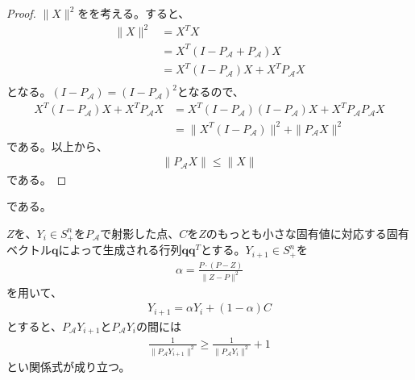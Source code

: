 \begin{proof}
  $\|X\|^2$をを考える。すると、
  \begin{align*}
    \|X\|^2 & = X^T X \\
            & = X^T \left(I - P_\mathcal{A} + P_\mathcal{A}\right) X \\
            & = X^T \left(I - P_\mathcal{A}\right) X + X^T P_\mathcal{A} X \\
  \end{align*}
  となる。$\left(I - P_\mathcal{A}\right) = \left(I - P_\mathcal{A}\right)^2$となるので、
  \begin{align*}
    X^T \left(I - P_\mathcal{A}\right) X + X^T P_\mathcal{A} X & = X^T \left(I - P_\mathcal{A}\right) \left(I - P_\mathcal{A}\right) X + X^T P_\mathcal{A} P_\mathcal{A} X\\
                                                               & = \|X^T \left(I - P_\mathcal{A}\right)\|^2 + \|P_\mathcal{A} X\|^2
  \end{align*}
  である。以上から、
  \begin{align*}
    \|P_\mathcal{A} X\| \leq \|X\|
  \end{align*}
  である。
\end{proof}
である。
\begin{lemma} \label{Increment}
  $Z$を、$Y_i \in S_+^n$を$P_\mathcal{A}$で射影した点、$C$を$Z$のもっとも小さな固有値に対応する固有ベクトル$\mathbf{q}$によって生成される行列$\mathbf{q} \mathbf{q}^T$とする。$Y_{i + 1} \in S_+^n$を
  \begin{align*}
    \alpha = \frac{P \cdot (P - Z)}{\|Z - P\|^2}
  \end{align*}
  を用いて、
  \begin{align*}
    Y_{i + 1} = \alpha Y_i + (1 - \alpha) C
  \end{align*}
  とすると、$P_\mathcal{A} Y_{i + 1}$と$P_\mathcal{A} Y_i$の間には
  \begin{align*}
    \frac{1}{\|P_\mathcal{A} Y_{i + 1}\|^2} \geq \frac{1}{\|P_\mathcal{A} Y_i\|^2} + 1
  \end{align*}
  とい関係式が成り立つ。
\end{lemma}
